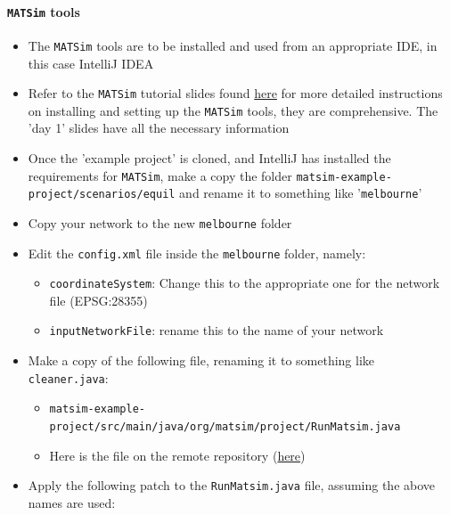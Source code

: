 \documentclass[11pt]{article}
\begin{document}
\paragraph{\texttt{MATSim} tools}
\label{sec:orgf7c3b6c}
\begin{itemize}
\item The \texttt{MATSim} tools are to be installed and used from an appropriate IDE, in this case IntelliJ IDEA
\item Refer to the \texttt{MATSim} tutorial slides found \href{https://www.simunto.com/matsim/tutorials/eifer2019/}{here} for more detailed instructions on installing and setting up the \texttt{MATSim} tools, they are comprehensive. The 'day 1' slides have all the necessary information
\item Once the 'example project' is cloned, and IntelliJ has installed the requirements for \texttt{MATSim}, make a copy the folder \texttt{matsim-example-project/scenarios/equil} and rename it to something like '\texttt{melbourne}'
\item Copy your network to the new \texttt{melbourne} folder
\item Edit the \texttt{config.xml} file inside the \texttt{melbourne} folder, namely:
\begin{itemize}
\item \texttt{coordinateSystem}: Change this to the appropriate one for the network file (EPSG:28355)
\item \texttt{inputNetworkFile}: rename this to the name of your network
\end{itemize}
\item Make a copy of the following file, renaming it to something like \texttt{cleaner.java}:
\begin{itemize}
\item \texttt{matsim-example-project/src/main/java/org/matsim/project/RunMatsim.java}
\item Here is the file on the remote repository (\href{https://github.com/matsim-org/matsim-example-project/blob/master/src/main/java/org/matsim/project/RunMatsim.java}{here})
\end{itemize}
\item Apply the following patch to the \texttt{RunMatsim.java} file, assuming the above names are used:
\end{itemize}
\end{document}
